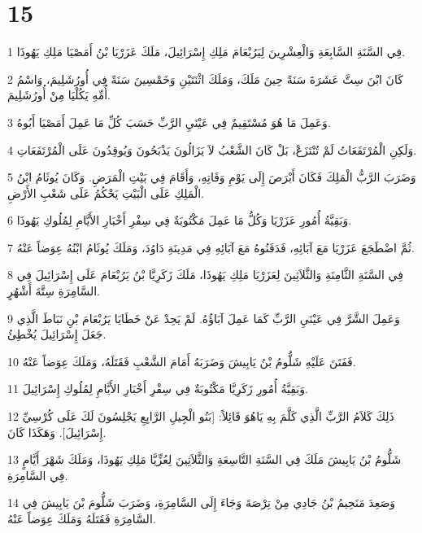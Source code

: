 \chapter{15}

\par 1 فِي السَّنَةِ السَّابِعَةِ وَالْعِشْرِينَ لِيَرُبْعَامَ مَلِكِ إِسْرَائِيلَ، مَلَكَ عَزَرْيَا بْنُ أَمَصْيَا مَلِكِ يَهُوذَا.
\par 2 كَانَ ابْنَ سِتَّ عَشَرَةَ سَنَةً حِينَ مَلَكَ، وَمَلَكَ اثْنَتَيْنِ وَخَمْسِينَ سَنَةً فِي أُورُشَلِيمَ، وَاسْمُ أُمِّهِ يَكُلْيَا مِنْ أُورُشَلِيمَ.
\par 3 وَعَمِلَ مَا هُوَ مُسْتَقِيمٌ فِي عَيْنَيِ الرَّبِّ حَسَبَ كُلِّ مَا عَمِلَ أَمَصْيَا أَبُوهُ.
\par 4 وَلَكِنِ الْمُرْتَفَعَاتُ لَمْ تُنْتَزَعْ، بَلْ كَانَ الشَّعْبُ لاَ يَزَالُونَ يَذْبَحُونَ وَيُوقِدُونَ عَلَى الْمُرْتَفَعَاتِ.
\par 5 وَضَرَبَ الرَّبُّ الْمَلِكَ فَكَانَ أَبْرَصَ إِلَى يَوْمِ وَفَاتِهِ، وَأَقَامَ فِي بَيْتِ الْمَرَضِ. وَكَانَ يُوثَامُ ابْنُ الْمَلِكِ عَلَى الْبَيْتِ يَحْكُمُ عَلَى شَعْبِ الأَرْضِ.
\par 6 وَبَقِيَّةُ أُمُورِ عَزَرْيَا وَكُلُّ مَا عَمِلَ مَكْتُوبَةٌ فِي سِفْرِ أَخْبَارِ الأَيَّامِ لِمُلُوكِ يَهُوذَا.
\par 7 ثُمَّ اضْطَجَعَ عَزَرْيَا مَعَ آبَائِهِ، فَدَفَنُوهُ مَعَ آبَائِهِ فِي مَدِينَةِ دَاوُدَ، وَمَلَكَ يُوثَامُ ابْنُهُ عِوَضاً عَنْهُ.
\par 8 فِي السَّنَةِ الثَّامِنَةِ وَالثَّلاَثِينَ لِعَزَرْيَا مَلِكِ يَهُوذَا، مَلَكَ زَكَرِيَّا بْنُ يَرُبْعَامَ عَلَى إِسْرَائِيلَ فِي السَّامِرَةِ سِتَّةَ أَشْهُرٍ.
\par 9 وَعَمِلَ الشَّرَّ فِي عَيْنَيِ الرَّبِّ كَمَا عَمِلَ آبَاؤُهُ. لَمْ يَحِدْ عَنْ خَطَايَا يَرُبْعَامَ بْنِ نَبَاطَ الَّذِي جَعَلَ إِسْرَائِيلَ يُخْطِئُ.
\par 10 فَفَتَنَ عَلَيْهِ شَلُّومُ بْنُ يَابِيشَ وَضَرَبَهُ أَمَامَ الشَّعْبِ فَقَتَلَهُ، وَمَلَكَ عِوَضاً عَنْهُ.
\par 11 وَبَقِيَّةُ أُمُورِ زَكَرِيَّا مَكْتُوبَةٌ فِي سِفْرِ أَخْبَارِ الأَيَّامِ لِمُلُوكِ إِسْرَائِيلَ.
\par 12 ذَلِكَ كَلاَمُ الرَّبِّ الَّذِي كَلَّمَ بِهِ يَاهُوَ قَائِلاً: [بَنُو الْجِيلِ الرَّابِعِ يَجْلِسُونَ لَكَ عَلَى كُرْسِيِّ إِسْرَائِيلَ]. وَهَكَذَا كَانَ.
\par 13 شَلُّومُ بْنُ يَابِيشَ مَلَكَ فِي السَّنَةِ التَّاسِعَةِ وَالثَّلاَثِينَ لِعُزِّيَّا مَلِكِ يَهُوذَا، وَمَلَكَ شَهْرَ أَيَّامٍ فِي السَّامِرَةِ.
\par 14 وَصَعِدَ مَنَحِيمُ بْنُ جَادِي مِنْ تِرْصَةَ وَجَاءَ إِلَى السَّامِرَةِ، وَضَرَبَ شَلُّومَ بْنَ يَابِيشَ فِي السَّامِرَةِ فَقَتَلَهُ وَمَلَكَ عِوَضاً عَنْهُ.
